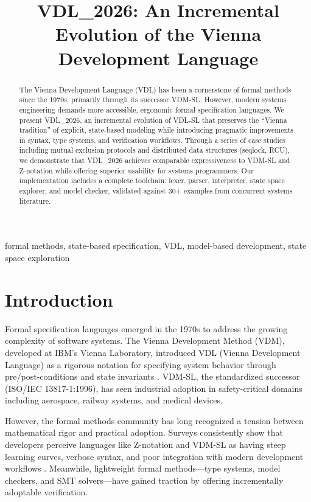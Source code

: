\documentclass[conference]{IEEEtran}
\begin{document}
\title{VDL\_2026: An Incremental Evolution of the Vienna Development Language}

\author{
}

\maketitle

\begin{abstract}
The Vienna Development Language (VDL) has been a cornerstone of formal methods since the 1970s, primarily through its successor VDM-SL. However, modern systems engineering demands more accessible, ergonomic formal specification languages. We present VDL\_2026, an incremental evolution of VDL-SL that preserves the ``Vienna tradition'' of explicit, state-based modeling while introducing pragmatic improvements in syntax, type systems, and verification workflows. Through a series of case studies including mutual exclusion protocols and distributed data structures (seqlock, RCU), we demonstrate that VDL\_2026 achieves comparable expressiveness to VDM-SL and Z-notation while offering superior usability for systems programmers. Our implementation includes a complete toolchain: lexer, parser, interpreter, state space explorer, and model checker, validated against 30+ examples from concurrent systems literature.
\end{abstract}

\begin{IEEEkeywords}
formal methods, state-based specification, VDL, model-based development, state space exploration
\end{IEEEkeywords}

\section{Introduction}

Formal specification languages emerged in the 1970s to address the growing complexity of software systems. The Vienna Development Method (VDM), developed at IBM's Vienna Laboratory, introduced VDL (Vienna Development Language) as a rigorous notation for specifying system behavior through pre/post-conditions and state invariants \cite{jones1990}. VDM-SL, the standardized successor (ISO/IEC 13817-1:1996), has seen industrial adoption in safety-critical domains including aerospace, railway systems, and medical devices.

However, the formal methods community has long recognized a tension between mathematical rigor and practical adoption. Surveys consistently show that developers perceive languages like Z-notation and VDM-SL as having steep learning curves, verbose syntax, and poor integration with modern development workflows \cite{woodcock2009}. Meanwhile, lightweight formal methods---type systems, model checkers, and SMT solvers---have gained traction by offering incrementally adoptable verification.
\end{document}
